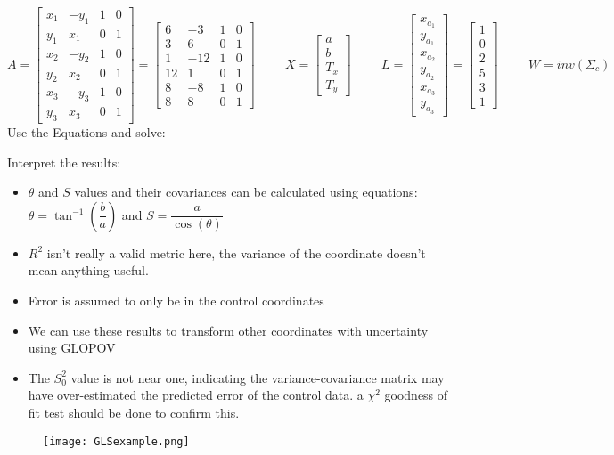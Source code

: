 \[
A = \begin{bmatrix}
x_1 & -y_1 & 1 & 0\\
y_1 & x_1 & 0 & 1\\
x_2 & -y_2 & 1 & 0\\
y_2 & x_2 & 0 & 1\\
x_3 & -y_3 & 1 & 0\\
y_3 & x_3 & 0 & 1
\end{bmatrix} =
\begin{bmatrix}
6 & -3 & 1 & 0\\
3 & 6 & 0 & 1\\
1 & -12 & 1 & 0\\
12 & 1 & 0 & 1\\
8 & -8 & 1 & 0\\
8 & 8 & 0 & 1
\end{bmatrix}
\hspace{1cm}
X = 
\begin{bmatrix}
a \\ b \\ T_x \\ T_y 
\end{bmatrix}
\hspace{1cm}
L =
\begin{bmatrix}
x_{a_1} \\ y_{a_1} \\ x_{a_2} \\ y_{a_2} \\ x_{a_3} \\ y_{a_3}
\end{bmatrix} = 
\begin{bmatrix}
1 \\ 0 \\2 \\5 \\3 \\1 
\end{bmatrix}
\hspace{1cm}
W = inv(\Sigma_c)
\]
\clearpage
Use the Equations and solve:

Interpret the results:
\begin{itemize}
	\item $\theta$ and $S$ values and their covariances can be calculated using equations: $\theta = \tan^{-1}(\dfrac{b}{a})$ and $S = \dfrac{a}{\cos(\theta)}$
	\item $R^2$ isn't really a valid metric here, the variance of the coordinate doesn't mean anything useful.
	\item Error is assumed to only be in the control coordinates
	\item We can use these results to transform other coordinates with uncertainty using GLOPOV
	\item The $S_0^2$ value is not near one, indicating the variance-covariance matrix may have over-estimated the predicted error of the control data. a $\chi^2$ goodness of fit test should be done to confirm this.  
\end{itemize}
\begin{figure}[H]
	\centering
	\texttt{[image: GLSexample.png]}
\end{figure}
\clearpage
